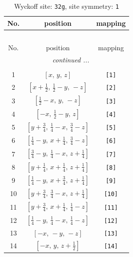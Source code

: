 \documentclass[fleqn,8pt]{jsarticle}
\begin{document}
\renewcommand{\arraystretch}{1.2}
\begin{longtable}{ccc}
\caption{Wyckoff site: {\tt 32g}, site symmetry: {\tt 1}}
 \\
 \hline \hline
No. & position & mapping \\ \hline \endfirsthead

\multicolumn{2}{l}{\tablename\ \thetable{}} \\
 \hline \hline
No. & position & mapping \\ \hline \endhead

 \hline \hline
\multicolumn{2}{r}{\footnotesize\it continued ...} \\ \endfoot

 \hline \hline
\multicolumn{2}{r}{} \\ \endlastfoot

1 & $\left[ x,\, y,\, z \right]$ & {\tt [1]} \\ \hline
2 & $\left[ x + \frac{1}{2},\, \frac{1}{2} - y,\, - z \right]$ & {\tt [2]} \\ \hline
3 & $\left[ \frac{1}{2} - x,\, y,\, - z \right]$ & {\tt [3]} \\ \hline
4 & $\left[ - x,\, \frac{1}{2} - y,\, z \right]$ & {\tt [4]} \\ \hline
5 & $\left[ y + \frac{3}{4},\, \frac{1}{4} - x,\, \frac{3}{4} - z \right]$ & {\tt [5]} \\ \hline
6 & $\left[ \frac{1}{4} - y,\, x + \frac{1}{4},\, \frac{3}{4} - z \right]$ & {\tt [6]} \\ \hline
7 & $\left[ \frac{3}{4} - y,\, \frac{1}{4} - x,\, z + \frac{1}{4} \right]$ & {\tt [7]} \\ \hline
8 & $\left[ y + \frac{1}{4},\, x + \frac{1}{4},\, z + \frac{1}{4} \right]$ & {\tt [8]} \\ \hline
9 & $\left[ \frac{1}{4} - y,\, x + \frac{3}{4},\, z + \frac{1}{4} \right]$ & {\tt [9]} \\ \hline
10 & $\left[ y + \frac{3}{4},\, \frac{3}{4} - x,\, z + \frac{1}{4} \right]$ & {\tt [10]} \\ \hline
11 & $\left[ y + \frac{3}{4},\, x + \frac{1}{4},\, \frac{1}{4} - z \right]$ & {\tt [11]} \\ \hline
12 & $\left[ \frac{1}{4} - y,\, \frac{1}{4} - x,\, \frac{1}{4} - z \right]$ & {\tt [12]} \\ \hline
13 & $\left[ - x,\, - y,\, - z \right]$ & {\tt [13]} \\ \hline
14 & $\left[ - x,\, y,\, z + \frac{1}{2} \right]$ & {\tt [14]} \\ \hline

\end{longtable}
\end{document}
